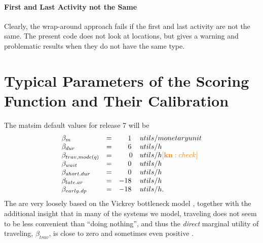 \paragraph*{First and Last Activity not the Same}

Clearly, the wrap-around approach fails if the first and last activity are not the same.  The present code does not look at locations, but gives a warning and problematic results when they do not have the same type.

\section{Typical Parameters of the Scoring Function and Their Calibration}



The \gls{matsim} default values for release 7 will be
\begin{equation}
  \begin{array}{lcrl}
\beta_{m} & = & 1\, & utils/monetary unit \\
\beta_{dur} & = & 6\, & utils/h \\
\beta_{trav, mode(q)} & = & 0 & utils/h {\color{orange} [\textbf{kn}: check]} \\
\beta_{wait} & = & 0\, & utils/h \\
\beta_{short.dur} & = & 0\, & utils/h \\
\beta_{late.ar} & = & -18\, & utils/h \\
\beta_{early.dp} & = & -18\, & utils/h .\\
  \end{array}
\label{eq:std-params}
\end{equation}
The are very loosely based on the Vickrey bottleneck model \citep[e.g.][]{ArnottEtcBottleneck-inelastic}, together with the additional insight that in many of the systems we model, traveling does not seem to be less convenient than ``doing nothing'', and thus the \emph{direct} marginal utility of traveling, $\beta_{trav}$, is close to zero and sometimes even positive \citep[\cf][]{} .

